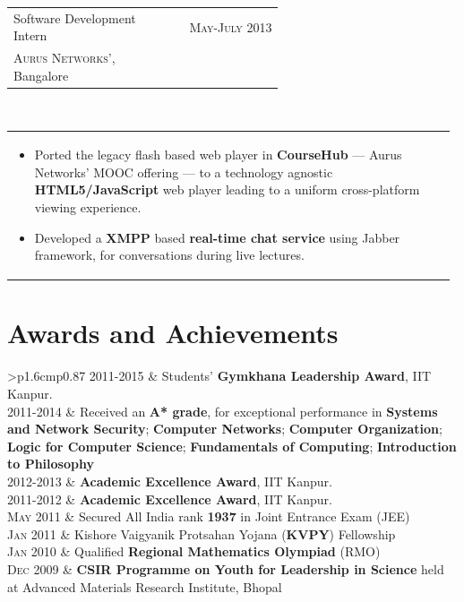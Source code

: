 \documentclass[a4paper]{article} %
\newcommand{\verticalspacing}{-0.25cm}
\newcommand{\bulletspace}{0.7cm}
\newcommand{\projectheadspacing}{6.9cm}
\newcommand{\cproject}[5]{%
    \begin{tabular}{p{0.60\linewidth}r}
        \textcolor{NavyBlue}{\small #2} & \multicolumn{1}{m{ \projectheadspacing{} }}{\raggedleft \small {\textsc{#1}}}\\
        \small {#3} & \small {#4}
    \end{tabular}\\
    \begin{tabular}{p{0.98\linewidth}}
    \vspace{-0.3cm}
        \small{#5}
    \end{tabular}
    \vspace{\verticalspacing{}}
}
\newcommand{\itemlist}[1]{%
    \def\arraystretch{1.2}
    \begin{tabular}{>{\raggedleft}p{1.6cm}p{0.87\linewidth}}
        #1
    \end{tabular}
    \def\arraystretch{1.0}
}
\begin{document}
\cproject
    {May-July 2013}
    {Software Development Intern}
    {\textsc{Aurus Networks'}, Bangalore}
    {}
    {%
        \begin{itemize}[leftmargin=\bulletspace{}]
            \item Ported the legacy flash based web player in \textbf{CourseHub} --- Aurus Networks'
                MOOC offering --- to a technology agnostic \textbf{HTML5/JavaScript} web player leading
                to a uniform cross-platform viewing experience.
            \item Developed a \textbf{XMPP} based \textbf{real-time chat service} using Jabber framework,
                for conversations during live lectures.
        \end{itemize}
    }

\section{Awards and Achievements}

\itemlist {%
    \textsc{\small 2011-2015}   & Students' \textbf{Gymkhana Leadership Award}, IIT Kanpur. \\
    \textsc{\small 2011-2014}   & Received an \textbf{A* grade}, for exceptional performance in
                                    \textbf{Systems and Network Security};
                                    \textbf{Computer Networks};
                                    \textbf{Computer Organization};
                                    \textbf{Logic for Computer Science};
                                    \textbf{Fundamentals of Computing};
                                    \textbf{Introduction to Philosophy} \\
    \textsc{\small 2012-2013}   & \textbf{Academic Excellence Award}, IIT Kanpur. \\
    \textsc{\small 2011-2012}   & \textbf{Academic Excellence Award}, IIT Kanpur. \\
    \textsc{\small May 2011}    & Secured All India rank \textbf{1937} in Joint Entrance Exam (JEE) \\
    \textsc{\small Jan 2011}    & Kishore Vaigyanik Protsahan Yojana (\textbf{KVPY}) Fellowship \\
    \textsc{\small Jan 2010}    & Qualified \textbf{Regional Mathematics Olympiad} (RMO) \\
    \textsc{\small Dec 2009}    & \textbf{CSIR Programme on Youth for Leadership in Science} held at Advanced Materials Research Institute, Bhopal\\
}
\end{document}
